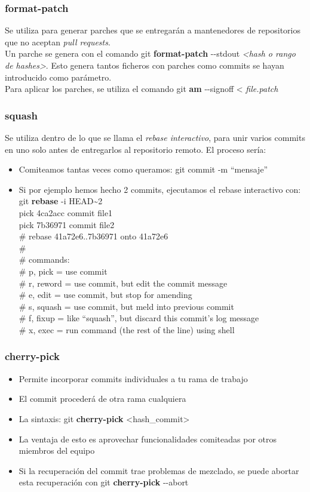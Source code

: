 \frame
{
\frametitle{format-patch}
 Se utiliza para generar parches que se entregarán a mantenedores de repositorios que no aceptan \textit{pull requests}.\\ \vspace{0.2cm}
 Un parche se genera con el comando git \textbf{format-patch} -{}-stdout \textit{<hash o rango de hashes>}. Esto genera tantos ficheros con parches como commits se hayan introducido como parámetro.\\ \vspace{0.2cm}
 Para aplicar los parches, se utiliza el comando git \textbf{am} -{}-signoff < \textit{file.patch}
}

\frame
{
\frametitle{squash}
 Se utiliza dentro de lo que se llama el \textit{rebase interactivo}, para unir varios commits en uno solo antes de entregarlos al repositorio remoto. El proceso sería:
 \begin{itemize}
  \item Comiteamos tantas veces como queramos: git commit -m ``mensaje''
  \item Si por ejemplo hemos hecho 2 commits, ejecutamos el rebase interactivo con: git \textbf{rebase} -i HEAD\textasciitilde2\\ \vspace{0.2cm}
  \footnotesize
   pick 4ca2acc commit file1\\
   pick 7b36971 commit file2\\
   
   \# rebase 41a72e6..7b36971 onto 41a72e6\\
   \#\\
   \# commands:\\
   \#  p, pick = use commit\\
   \#  r, reword = use commit, but edit the commit message\\
   \#  e, edit = use commit, but stop for amending\\
   \#  s, squash = use commit, but meld into previous commit\\
   \#  f, fixup = like ``squash'', but discard this commit's log message\\
   \#  x, exec = run command (the rest of the line) using shell
\end{itemize}
}

\frame
{
\frametitle{cherry-pick}
 \begin{itemize}
  \item Permite incorporar commits individuales a tu rama de trabajo
  \item El commit procederá de otra rama cualquiera
  \item La sintaxis: git \textbf{cherry-pick} <hash\_commit>
  \item La ventaja de esto es aprovechar funcionalidades comiteadas por otros miembros del equipo
  \item Si la recuperación del commit trae problemas de mezclado, se puede abortar esta recuperación con git \textbf{cherry-pick} -{}-abort
 \end{itemize}
}

